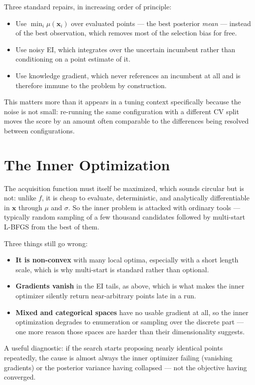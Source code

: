 \documentclass[conference]{IEEEtran}
\begin{document}
Three standard repairs, in increasing order of principle:
\begin{itemize}
    \item Use $\min_i \mu(\mathbf{x}_i)$ over evaluated points --- the best posterior \textit{mean} --- instead of the best observation, which removes most of the selection bias for free.
    \item Use noisy EI, which integrates over the uncertain incumbent rather than conditioning on a point estimate of it.
    \item Use knowledge gradient, which never references an incumbent at all and is therefore immune to the problem by construction.
\end{itemize}
This matters more than it appears in a tuning context specifically because the noise is not small: re-running the same configuration with a different CV split moves the score by an amount often comparable to the differences being resolved between configurations.

\section*{The Inner Optimization}
The acquisition function must itself be maximized, which sounds circular but is not: unlike $f$, it is cheap to evaluate, deterministic, and analytically differentiable in $\mathbf{x}$ through $\mu$ and $\sigma$. So the inner problem is attacked with ordinary tools --- typically random sampling of a few thousand candidates followed by multi-start L-BFGS from the best of them.

Three things still go wrong:
\begin{itemize}
    \item \textbf{It is non-convex} with many local optima, especially with a short length scale, which is why multi-start is standard rather than optional.
    \item \textbf{Gradients vanish} in the EI tails, as above, which is what makes the inner optimizer silently return near-arbitrary points late in a run.
    \item \textbf{Mixed and categorical spaces} have no usable gradient at all, so the inner optimization degrades to enumeration or sampling over the discrete part --- one more reason those spaces are harder than their dimensionality suggests.
\end{itemize}
A useful diagnostic: if the search starts proposing nearly identical points repeatedly, the cause is almost always the inner optimizer failing (vanishing gradients) or the posterior variance having collapsed --- not the objective having converged.
\end{document}
